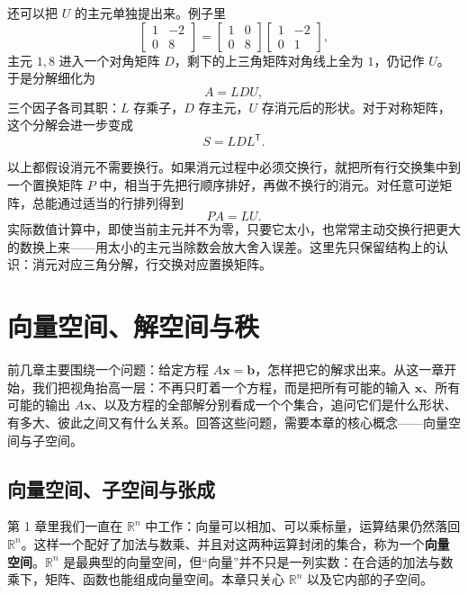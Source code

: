 \documentclass[UTF8,a4paper,12pt]{ctexart}
\numberwithin{equation}{section}
\newcommand{\R}{\mathbb{R}}
\newcommand{\trans}{^{\mathsf T}}
\begin{document}
	还可以把 $U$ 的主元单独提出来。例子里
	\begin{equation}\label{eq:4.67}
	\begin{bmatrix}
		1&-2\\
		0&8
	\end{bmatrix}
	=
	\begin{bmatrix}
		1&0\\
		0&8
	\end{bmatrix}
	\begin{bmatrix}
		1&-2\\
		0&1
	\end{bmatrix},
	\end{equation}
	主元 $1,8$ 进入一个对角矩阵 $D$，剩下的上三角矩阵对角线上全为 $1$，仍记作 $U$。于是分解细化为
	\begin{equation}\label{eq:4.68}
	A=LDU,
	\end{equation}
	三个因子各司其职：$L$ 存乘子，$D$ 存主元，$U$ 存消元后的形状。对于对称矩阵，这个分解会进一步变成
	\begin{equation}\label{eq:4.69}
	S=LDL\trans.
	\end{equation}
	
	以上都假设消元不需要换行。如果消元过程中必须交换行，就把所有行交换集中到一个置换矩阵 $P$ 中，相当于先把行顺序排好，再做不换行的消元。对任意可逆矩阵，总能通过适当的行排列得到
	\begin{equation}\label{eq:4.70}
	\boxed{PA=LU.}
	\end{equation}
	实际数值计算中，即使当前主元并不为零，只要它太小，也常常主动交换行把更大的数换上来——用太小的主元当除数会放大舍入误差。这里先只保留结构上的认识：消元对应三角分解，行交换对应置换矩阵。
	\section{向量空间、解空间与秩}
	
	前几章主要围绕一个问题：给定方程 $A\bm{x}=\bm{b}$，怎样把它的解求出来。从这一章开始，我们把视角抬高一层：不再只盯着一个方程，而是把所有可能的输入 $\bm{x}$、所有可能的输出 $A\bm{x}$、以及方程的全部解分别看成一个个集合，追问它们是什么形状、有多大、彼此之间又有什么关系。回答这些问题，需要本章的核心概念——向量空间与子空间。
	
	\subsection{向量空间、子空间与张成}
	
	第 1 章里我们一直在 $\R^n$ 中工作：向量可以相加、可以乘标量，运算结果仍然落回 $\R^n$。这样一个配好了加法与数乘、并且对这两种运算封闭的集合，称为一个\textbf{向量空间}。$\R^n$ 是最典型的向量空间，但“向量”并不只是一列实数：在合适的加法与数乘下，矩阵、函数也能组成向量空间。本章只关心 $\R^n$ 以及它内部的子空间。
	
\end{document}
